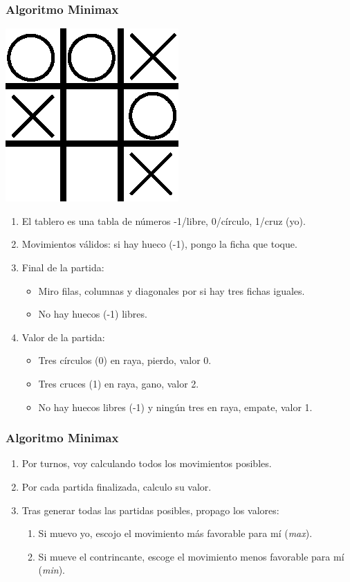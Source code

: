 \documentclass[a4paper,t,xcolor=pst,dvips,colortheme]{beamer}
\begin{document}
\begin{frame}[c]
    \frametitle{Algoritmo Minimax}
    \begin{center}
        \includegraphics[width=0.15\linewidth]{images/minimax/tresEnRaya.eps}
    \end{center}
    \begin{enumerate}[<+->]
        \item El tablero es una tabla de números -1/libre, 0/círculo, 1/cruz (yo).
        \item Movimientos válidos: si hay hueco (-1), pongo la ficha que toque.
        \item Final de la partida:
            \begin{itemize}
                \item Miro filas, columnas y diagonales por si hay tres fichas iguales.
                \item No hay huecos (-1) libres.
            \end{itemize}
        \item Valor de la partida:
            \begin{itemize}
                \item Tres círculos (0) en raya, pierdo, valor 0.
                \item Tres cruces (1) en raya, gano, valor 2.
                \item No hay huecos libres (-1) y ningún tres en raya, empate, valor 1.
            \end{itemize}
    \end{enumerate}
\end{frame}

\begin{frame}[c]
    \frametitle{Algoritmo Minimax}
    \begin{enumerate}[<+->]
        \item Por turnos, voy calculando todos los movimientos posibles.
        \item Por cada partida finalizada, calculo su valor.
        \item Tras generar todas las partidas posibles, propago los valores:
        \begin{enumerate}
            \item Si muevo yo, escojo el movimiento más favorable para mí (\emph{max}).
            \item Si mueve el contrincante, escoge el movimiento menos favorable para mí (\emph{min}).
        \end{enumerate}
    \end{enumerate}
\end{frame}
\end{document}
